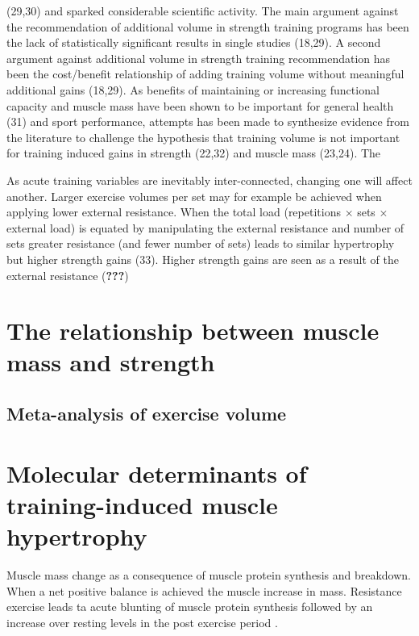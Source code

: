\documentclass[twoside,10pt]{gihclass} %
\begin{document}
(29,30) and sparked considerable scientific activity. The main argument against the recommendation of additional volume in strength training programs has been the lack of statistically significant results in single studies (18,29). A second argument against additional volume in strength training recommendation has been the cost/benefit relationship of adding training volume without meaningful additional gains
(18,29).
As benefits of maintaining or increasing functional capacity and muscle mass have been shown to be important for general health
(31)
and sport performance, attempts has been made to synthesize evidence from the literature to challenge the hypothesis that training volume is not important for training induced gains in strength
(22,32)
and muscle mass
(23,24).
The

As acute training variables are inevitably inter-connected, changing one will affect another. Larger exercise volumes per set may for example be achieved when applying lower external resistance. When the total load (repetitions \(\times\) sets \(\times\) external load) is equated by manipulating the external resistance and number of sets greater resistance (and fewer number of sets) leads to similar hypertrophy but higher strength gains
(33).
Higher strength gains are seen as a result of the external resistance ({\textbf{???}})

\hypertarget{the-relationship-between-muscle-mass-and-strength}{%
\section{The relationship between muscle mass and strength}\label{the-relationship-between-muscle-mass-and-strength}}

\hypertarget{meta-analysis-of-exercise-volume}{%
\subsection{Meta-analysis of exercise volume}\label{meta-analysis-of-exercise-volume}}

\hypertarget{molecular-determinants-of-training-induced-muscle-hypertrophy}{%
\section{Molecular determinants of training-induced muscle hypertrophy}\label{molecular-determinants-of-training-induced-muscle-hypertrophy}}

Muscle mass change as a consequence of muscle protein synthesis and breakdown. When a net positive balance is achieved the muscle increase in mass. Resistance exercise leads ta acute blunting of muscle protein synthesis followed by an increase over resting levels in the post exercise period
.
\end{document}
